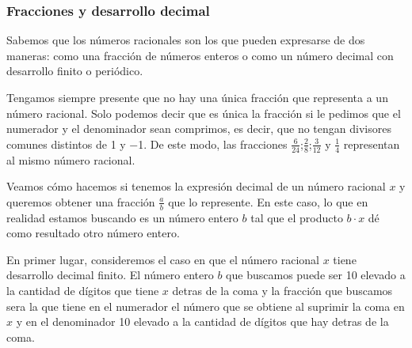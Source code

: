 \documentclass[../Teoría.root.tex]{subfiles}
\begin{document}
\subsubsection{Fracciones y desarrollo decimal}
Sabemos que los números racionales son los que pueden expresarse de dos maneras:
como una fracción de números enteros o como un número decimal con desarrollo finito o periódico.

Tengamos siempre presente que no hay una única fracción que representa a un número racional.
Solo podemos decir que es única la fracción si le pedimos que el numerador y el denominador sean comprimos, es decir, que no tengan divisores comunes distintos de 1 y −1.
De este modo, las fracciones \(\frac{6}{24}\);\(\frac{2}{8}\);\(\frac{3}{12}\) y \(\frac{1}{4}\) representan al mismo número racional.

Veamos cómo hacemos si tenemos la expresión decimal de un número racional \(x\) y queremos obtener una fracción \(\frac{a}{b}\) que lo represente.
En este caso, lo que en realidad estamos buscando es un número entero \(b\) tal que el producto \(b \cdot x\) dé como resultado otro número entero.

En primer lugar, consideremos el caso en que el número racional \(x\) tiene desarrollo decimal finito.
El número entero \(b\) que buscamos puede ser 10 elevado a la cantidad de dígitos que tiene \(x\) detras de la coma y la fracción que buscamos sera la que tiene en el numerador el número que se obtiene al suprimir la coma en \(x\) y en el denominador 10 elevado a la cantidad de dígitos que hay detras de la coma.
\end{document}
